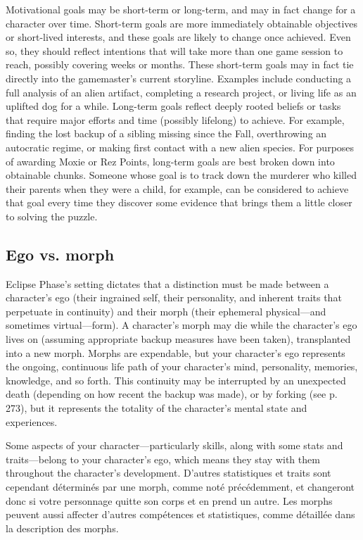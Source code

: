 Motivational goals may be short-term or long-term, and may in fact change for a character over time. Short-term goals are more immediately obtainable objectives or short-lived interests, and these goals are likely to change once achieved. Even so, they should reflect intentions that will take more than one game session to reach, possibly covering weeks or months. These short-term goals may in fact tie directly into the gamemaster's current storyline. Examples include conducting a full analysis of an alien artifact, completing a research project, or living life as an uplifted dog for a while. Long-term goals reflect deeply rooted beliefs or tasks that require major efforts and time (possibly lifelong) to achieve. For example, finding the lost backup of a sibling missing since the Fall, overthrowing an autocratic regime, or making first contact with a new alien species. For purposes of awarding Moxie or Rez Points, long-term goals are best broken down into obtainable chunks. Someone whose goal is to track down the murderer who killed their parents when they were a child, for example, can be considered to achieve that goal every time they discover some evidence that brings them a little closer to solving the puzzle. 

\subsection{Ego vs. morph} \label{sec:ego-vs.-morph-1} 

Eclipse Phase's setting dictates that a distinction must be made between a character's ego (their ingrained self, their personality, and inherent traits that perpetuate in continuity) and their morph (their ephemeral physical—and sometimes virtual—form). A character's morph may die while the character's ego lives on (assuming appropriate backup measures have been taken), transplanted into a new morph. Morphs are expendable, but your character's ego represents the ongoing, continuous life path of your character's mind, personality, memories, knowledge, and so forth. This continuity may be interrupted by an unexpected death (depending on how recent the backup was made), or by forking (see p. 273), but it represents the totality of the character's mental state and experiences. 

Some aspects of your character—particularly skills, along with some stats and traits—belong to your character's ego, which means they stay with them throughout the character's development. D'autres statistiques et traits sont cependant déterminés par une morph, comme noté précédemment, et changeront donc si votre personnage quitte son corps et en prend un autre. Les morphs peuvent aussi affecter d'autres compétences et statistiques, comme détaillée dans la description des morphs. 

